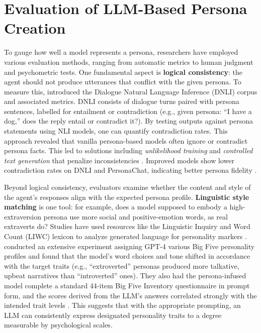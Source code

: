 \section{Evaluation of LLM-Based Persona Creation}
To gauge how well a model represents a persona, researchers have employed various
evaluation methods, ranging from automatic metrics to human judgment and psychometric
tests. One fundamental aspect is \textbf{logical consistency}: the agent should not
produce utterances that conflict with the given persona. To measure this,
\citet{welleck-etal-2019-dialogueNLI} introduced the Dialogue Natural Language
Inference (DNLI) corpus and associated metrics. DNLI consists of dialogue turns paired
with persona sentences, labelled for entailment or contradiction (e.g., given persona:
``I have a dog,'' does the reply entail or contradict it?). By testing outputs against
persona statements using NLI models, one can quantify contradiction rates. This
approach revealed that vanilla persona-based models often ignore or contradict persona
facts. This led to solutions including \emph{unlikelihood training} and
\emph{controlled text generation} that penalize inconsistencies
\cite{li-etal-2020-dont, kim-etal-2020-will}. Improved models show lower contradiction
rates on DNLI and PersonaChat, indicating better persona fidelity
\cite{kim-etal-2020-will}.

Beyond logical consistency, evaluators examine whether the content and style of the
agent's responses align with the expected persona profile. \textbf{Linguistic style
	matching} is one tool: for example, does a model supposed to embody a high-extraversion
persona use more social and positive-emotion words, as real extraverts do? Studies have
used resources like the Linguistic Inquiry and Word Count (LIWC) lexicon to analyze
generated language for personality markers \cite{jiang-etal-2023-personallm}.
\citet{jiang-etal-2023-personallm} conducted an extensive experiment assigning GPT-4
various Big Five personality profiles and found that the model's word choices and tone
shifted in accordance with the target traits (e.g., ``extroverted'' personas produced
more talkative, upbeat narratives than ``introverted'' ones). They also had the
persona-infused model complete a standard 44-item Big Five Inventory questionnaire in
prompt form, and the scores derived from the LLM's answers correlated strongly with the
intended trait levels \cite{jiang-etal-2023-personallm}. This suggests that with the
appropriate prompting, an LLM can consistently express designated personality traits to
a degree measurable by psychological scales.

